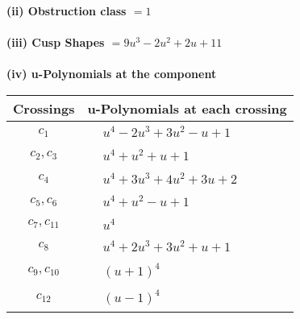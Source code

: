 \documentclass[1p]{elsarticle_modified}
\theoremstyle{definition}
\begin{document}
\flushleft \textbf{(ii) Obstruction class $= 1$}\\~\\
\flushleft \textbf{(iii) Cusp Shapes $= 9 u^3-2 u^2+2 u+11$}\\~\\
\newpage\renewcommand{\arraystretch}{1}
\flushleft \textbf{(iv) u-Polynomials at the component}\newline \\
\begin{tabular}{m{50pt}|m{274pt}}
Crossings & \hspace{64pt}u-Polynomials at each crossing \\
\hline $$\begin{aligned}c_{1}\end{aligned}$$&$\begin{aligned}
&u^4-2 u^3+3 u^2- u+1
\end{aligned}$\\
\hline $$\begin{aligned}c_{2},c_{3}\end{aligned}$$&$\begin{aligned}
&u^4+u^2+u+1
\end{aligned}$\\
\hline $$\begin{aligned}c_{4}\end{aligned}$$&$\begin{aligned}
&u^4+3 u^3+4 u^2+3 u+2
\end{aligned}$\\
\hline $$\begin{aligned}c_{5},c_{6}\end{aligned}$$&$\begin{aligned}
&u^4+u^2- u+1
\end{aligned}$\\
\hline $$\begin{aligned}c_{7},c_{11}\end{aligned}$$&$\begin{aligned}
&u^4
\end{aligned}$\\
\hline $$\begin{aligned}c_{8}\end{aligned}$$&$\begin{aligned}
&u^4+2 u^3+3 u^2+u+1
\end{aligned}$\\
\hline $$\begin{aligned}c_{9},c_{10}\end{aligned}$$&$\begin{aligned}
&(u+1)^4
\end{aligned}$\\
\hline $$\begin{aligned}c_{12}\end{aligned}$$&$\begin{aligned}
&(u-1)^4
\end{aligned}$\\
\hline
\end{tabular}\\~\\
\end{document}
